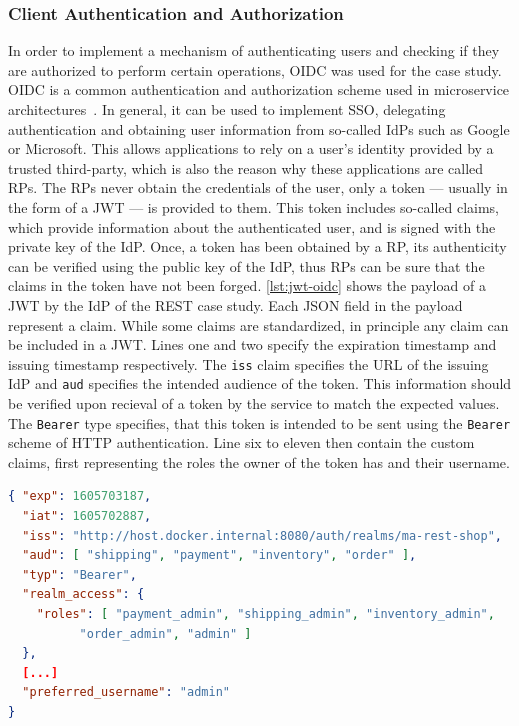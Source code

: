 \subsubsection{Client Authentication and Authorization}\label{sec:rest-auth}

In order to implement a mechanism of authenticating users and checking if they are authorized to perform certain operations, \ac{OIDC} was used for the case study.
\ac{OIDC} is a common authentication and authorization scheme used in microservice architectures~\cite{Nehme2019, Hammann2020}.
In general, it can be used to implement \ac{SSO}, delegating authentication and obtaining user information from so-called \acp{IdP} such as Google or Microsoft.
This allows applications to rely on a user's identity provided by a trusted third-party, which is also the reason why these applications are called \acp{RP}.
The \acp{RP} never obtain the credentials of the user, only a token --- usually in the form of a \ac{JWT} --- is provided to them.
This token includes so-called claims, which provide information about the authenticated user, and is signed with the private key of the \ac{IdP}.
Once, a token has been obtained by a \ac{RP}, its authenticity can be verified using the public key of the \ac{IdP}, thus \acp{RP} can be sure that the claims in the token have not been forged.
\autoref{lst:jwt-oidc} shows the payload of a \ac{JWT} by the \ac{IdP} of the \ac{REST} case study.
Each \ac{JSON} field in the payload represent a claim.
While some claims are standardized, in principle any claim can be included in a \ac{JWT}.
Lines one and two specify the expiration timestamp and issuing timestamp respectively.
The \texttt{iss} claim specifies the \ac{URL} of the issuing \ac{IdP} and \texttt{aud} specifies the intended audience of the token.
This information should be verified upon recieval of a token by the service to match the expected values.
The \texttt{Bearer} type specifies, that this token is intended to be sent using the \texttt{Bearer} scheme of \ac{HTTP} authentication.
Line six to eleven then contain the custom claims, first representing the roles the owner of the token has and their username.

\begin{lstlisting}[caption={\ac{JWT} Issued by an \ac{IdP}}, language=json, label={lst:jwt-oidc}]
{ "exp": 1605703187,
  "iat": 1605702887,
  "iss": "http://host.docker.internal:8080/auth/realms/ma-rest-shop",
  "aud": [ "shipping", "payment", "inventory", "order" ],
  "typ": "Bearer",
  "realm_access": {
    "roles": [ "payment_admin", "shipping_admin", "inventory_admin",
          "order_admin", "admin" ]
  },
  [...]
  "preferred_username": "admin"
}
\end{lstlisting}

